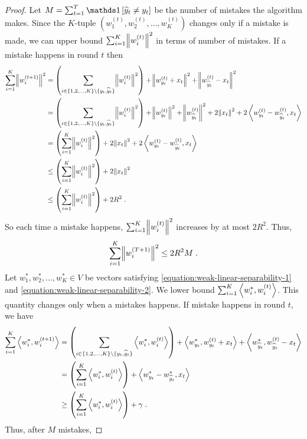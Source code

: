 \begin{proof}
Let $M = \sum_{t=1}^T \indicator{\widehat y_t \neq y_t}$ be the number of
mistakes the algorithm makes. Since the $K$-tuple $(w_1^{(t)}, w_2^{(t)}, \dots,
w_K^{(t)})$ changes only if a mistake is made, we can upper bound $\sum_{i=1}^K
\norm{w_i^{(t)}}^2$ in terms of number of mistakes.
If a mistake happens in round $t$ then
\begin{align*}
\sum_{i=1}^K \norm{w_i^{(t+1)}}^2
& = \left(\sum_{i \in \{1,2,\dots,K\} \setminus \{y_t, \widehat y_t\} } \norm{w_i^{(t)}}^2 \right)
 + \norm{w_{y_t}^{(t)} + x_t}^2 + \norm{w_{\widehat y_t}^{(t)} - x_t}^2 \\
& = \left(\sum_{i \in \{1,2,\dots,K\} \setminus \{y_t, \widehat y_t\} } \norm{w_i^{(t)}}^2 \right) + \norm{w_{y_t}^{(t)}}^2 + \norm{w_{\widehat y_t}^{(t)}}^2 
 + 2 \norm{x_t}^2 + 2 \left\langle w_{y_t}^{(t)} - w_{\widehat y_t}^{(t)}, x_t \right\rangle \\
& = \left(\sum_{i=1}^K \norm{w_i^{(t)}}^2 \right) + 2 \norm{x_t}^2 + 2 \left\langle w_{y_t}^{(t)} - w_{\widehat y_t}^{(t)}, x_t \right\rangle \\
& \le \left(\sum_{i=1}^K \norm{w_i^{(t)}}^2 \right) + 2 \norm{x_t}^2 \\
& \le \left(\sum_{i=1}^K \norm{w_i^{(t)}}^2 \right) + 2 R^2 \; .
\end{align*}
So each time a mistake happens, $\sum_{i=1}^K \norm{w_i^{(t)}}^2$ increases by at most $2R^2$. Thus,
\begin{equation}
\sum_{i=1}^K \norm{w_i^{(T+1)}}^2 \le 2R^2 M \; .
\label{equation:perceptron-norm-ub}
\end{equation}
Let $w_1^*, w_2^*, \dots, w_K^* \in V$ be vectors satisfying
\eqref{equation:weak-linear-separability-1} and
\eqref{equation:weak-linear-separability-2}. We lower bound $\sum_{i=1}^K \left\langle w_i^*, w_i^{(t)} \right\rangle$. This quantity changes
only when a mistakes happens. If mistake happens in round $t$, we have
\begingroup
\allowdisplaybreaks
\begin{align*}
\sum_{i=1}^K \left\langle w_i^*, w_i^{(t+1)} \right\rangle
& = \left( \sum_{i \in \{1,2,\dots,K\} \setminus \{y_t, \widehat y_t\}} \left\langle w_i^*, w_i^{(t)} \right\rangle \right)
 + \left\langle w_{y_t}^*, w_{y_t}^{(t)} + x_t \right\rangle + \left\langle w_{\widehat y_t}^*, w_{\widehat y_t}^{(t)} - x_t \right\rangle \\
& = \left( \sum_{i=1}^K \left\langle w_i^*, w_i^{(t)} \right\rangle \right) + \left\langle w_{y_t}^* - w_{\widehat y_t}^*, x_t \right\rangle \\
& \ge  \left( \sum_{i=1}^K \left\langle w_i^*, w_i^{(t)} \right\rangle \right) + \gamma \; .
\end{align*}
\endgroup
Thus, after $M$ mistakes,

\end{proof}
